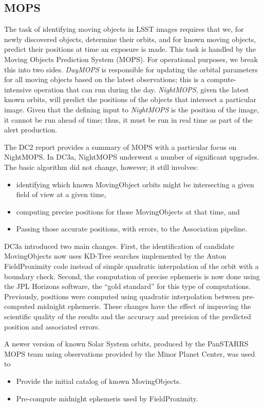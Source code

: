 
\subsection{MOPS}

The task of identifying moving objects in LSST images requires that
we, for newly discovered objects, determine their orbits, and for
known moving objects, predict their positions at time an exposure is
made.  This task is handled by the Moving Objects Prediction System
(MOPS).  For operational purposes, we break this into two sides.  {\it
  DayMOPS} is responsible for updating the orbital parameters for all
moving objects based on the latest observations; this is a 
compute-intensive operation that can run during the day.  {\it
  NightMOPS}, given the latest known orbits, will predict the
positions of the objects that intersect a particular image.  Given
that the defining input to {\it NightMOPS} is the position of the
image, it cannot be run ahead of time; thus, it must be run in real
time as part of the alert production.  

The DC2 report provides a summary of MOPS with a particular focus on
NightMOPS.  In DC3a, NightMOPS underwent a number of significant 
upgrades.  The basic algorithm did not change, however; it still involves:
\begin{itemize}
    \item identifying which known MovingObject orbits might be intersecting a 
          given field of view at a given time,
    \item computing precise positions for those MovingObjects at that
      time, and 
    \item Passing those accurate positions, with errors, to the Association 
          pipeline.
\end{itemize}

DC3a introduced two main changes.  First, the identification of
candidate MovingObjects now uses KD-Tree searches implemented by the
Auton FieldProximity code instead of simple quadratic interpolation of
the orbit with a boundary check.  Second, the computation of precise
ephemeris is now done using the JPL Horizons software, the ``gold
standard'' for this type of computations.  Previously, positions were
computed using quadratic interpolation between pre-computed midnight
ephemeris.  These changes have the effect of improving the scientific
quality of the results and the accuracy and precision of the predicted
position and associated errors. 

A newer version of known Solar System orbits, produced by the PanSTARRS MOPS 
team using observations provided by the Minor Planet Center, was used to
\begin{itemize}
    \item Provide the initial catalog of known MovingObjects.
    \item Pre-compute midnight ephemeris used by FieldProximity.
\end{itemize}









